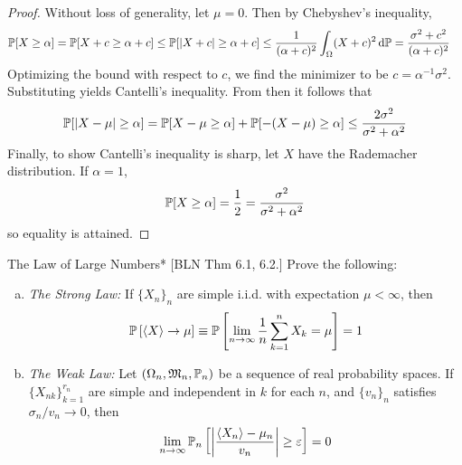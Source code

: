 \begin{proof}
    Without loss of generality, let \(\mu = 0\). Then by Chebyshev's inequality,
    \begin{align*}
        \mathbb{P}[X \geq \alpha]
        &= \mathbb{P}[X + c \geq \alpha + c]
        \leq \mathbb{P}[|X + c| \geq \alpha + c]
        \leq \frac{1}{(\alpha + c)^2} \int_{\Omega} (X + c)^2 \, \mathrm{d}\mathbb{P}
        = \frac{\sigma^2 + c^2}{(\alpha + c)^2}
    \end{align*}
    Optimizing the bound with respect to \(c\), we find the minimizer to be \(c = \alpha^{-1} \sigma^2\). Substituting yields Cantelli's inequality. From then it follows that
    \[
        \mathbb{P}[|X - \mu| \geq \alpha]
        = \mathbb{P}[X - \mu \geq \alpha] + \mathbb{P}[-(X - \mu) \geq \alpha]
        \leq \frac{2\sigma^2}{\sigma^2 + \alpha^2}
    \]
    Finally, to show Cantelli's inequality is sharp, let \(X\) have the Rademacher distribution. If \(\alpha = 1\),
    \[
        \mathbb{P}[X \geq \alpha] = \frac{1}{2} = \frac{\sigma^2}{\sigma^2 + \alpha^2}
    \]
    so equality is attained.
\end{proof}


\begin{problem}{The Law of Large Numbers}*
    [BLN Thm 6.1, 6.2.] Prove the following:
    \begin{enumerate}[(a)]
        \itemsep0em
        \item \emph{The Strong Law:} If \(\{X_n\}_n\) are simple i.i.d. with expectation \(\mu < \infty\), then
        \[
            \bb{P}\left[\ev{X} \to \mu\right]
            \equiv \bb{P}\left[ \lim_{n \to \infty} \frac{1}{n} \sum_{k=1}^n X_k = \mu \right]
            = 1
        \]
        \item \emph{The Weak Law:} Let \((\Omega_n, \mathfrak{M}_n, \mathbb{P}_n)\) be a sequence of real probability spaces. If \(\{X_{nk}\}_{k=1}^{r_n}\) are simple and independent in \(k\) for each \(n\), and \(\{v_n\}_n\) satisfies \(\sigma_n / v_n \to 0\), then
        \[
            \lim_{n \to \infty} \bb{P}_n \left[ \left| \frac{\ev{X_n} - \mu_n}{v_n} \right| \geq \varepsilon \right] = 0
        \]
    \end{enumerate}
\end{problem}




